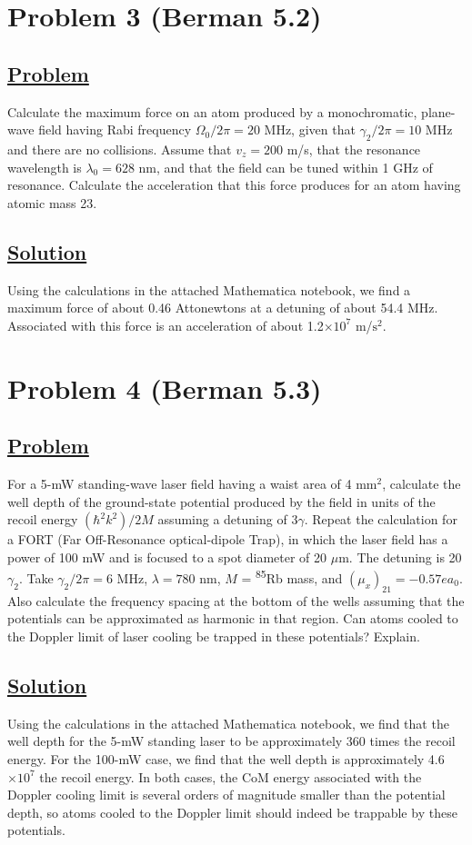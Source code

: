 \documentclass[12pt]{article}
\begin{document}
\section*{Problem 3 (Berman 5.2)}
\subsection*{\small\underline{Problem}}
Calculate the maximum force on an atom produced by a monochromatic, plane-wave field having Rabi frequency $\Omega_0/2\pi = 2   0$ MHz, given that $\gamma_2/2\pi = 10$ MHz and there are no collisions.
Assume that $v_z = 200$ m/s, that the resonance wavelength is $\lambda_0 = 628$ nm, and that the field can be tuned within 1 GHz of resonance.
Calculate the acceleration that this force produces for an atom having atomic mass 23.

\subsection*{\small\underline{Solution}}
Using the calculations in the attached Mathematica notebook, we find a maximum force of about 0.46 Attonewtons at a detuning of about 54.4 MHz.
Associated with this force is an acceleration of about 1.2$\times10^7$ m/$\text{s}^2$.


\section*{Problem 4 (Berman 5.3)}
\subsection*{\small\underline{Problem}}
For a 5-mW standing-wave laser field having a waist area of 4 $\text{mm}^2$, calculate the well depth of the ground-state potential produced by the field in units of the recoil energy $(\hbar^2k^2)/2M$ assuming a detuning of $3\gamma$.
Repeat the calculation for a FORT (Far Off-Resonance optical-dipole Trap), in which the laser field has a power of 100 mW and is focused to a spot diameter of 20 $\mu$m.
The detuning is 20$\gamma_2$. Take $\gamma_2/2\pi = 6$ MHz, $\lambda = 780$ nm, $M$ = \textsuperscript{85}Rb mass, and $\left(\mu_x\right)_{21} = -0.57ea_0$.
Also calculate the frequency spacing at the bottom of the wells assuming that the potentials can be approximated as harmonic in that region.
Can atoms cooled to the Doppler limit of laser cooling be trapped in these potentials? Explain.

\subsection*{\small\underline{Solution}}
Using the calculations in the attached Mathematica notebook, we find that the well depth for the 5-mW standing laser to be approximately 360 times the recoil energy.
For the 100-mW case, we find that the well depth is approximately 4.6$\times 10^7$ the recoil energy.
In both cases, the CoM energy associated with the Doppler cooling limit is several orders of magnitude smaller than the potential depth, so atoms cooled to the Doppler limit should indeed be trappable by these potentials.
\end{document}
